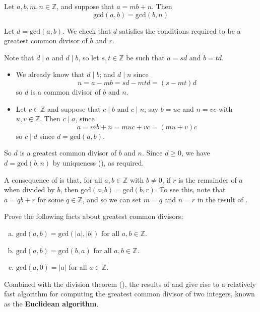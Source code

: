 \begin{theorem}
\label{thmGCDSubtractMultiple}
Let $a,b,m,n \in \mathbb{Z}$, and suppose that $a=mb+n$. Then
\[ \mathrm{gcd}(a,b) = \mathrm{gcd}(b,n) \]
\end{theorem}
\begin{cproof}
Let $d = \mathrm{gcd}(a,b)$. We check that $d$ satisfies the conditions required to be a greatest common divisor of $b$ and $r$.

Note that $d \mid a$ and $d \mid b$, so let $s,t \in \mathbb{Z}$ be such that $a=sd$ and $b=td$.
\begin{itemize}
\item We already know that $d \mid b$; and $d \mid n$ since
\[ n = a-mb = sd-mtd = (s-mt)d \]
so $d$ is a common divisor of $b$ and $n$.
\item Let $c \in \mathbb{Z}$ and suppose that $c \mid b$ and $c \mid n$; say $b = uc$ and $n=vc$ with $u,v \in \mathbb{Z}$. Then $c \mid a$, since
\[ a = mb+n = muc+vc = (mu+v)c \]
so $c \mid d$ since $d = \mathrm{gcd}(a,b)$.
\end{itemize}
So $d$ is a greatest common divisor of $b$ and $n$. Since $d \ge 0$, we have $d = \mathrm{gcd}(b,n)$ by uniqueness (), as required.
\end{cproof}

A consequence of  is that, for all $a,b \in \mathbb{Z}$ with $b \ne 0$, if $r$ is the remainder of $a$ when divided by $b$, then $\mathrm{gcd}(a,b) = \mathrm{gcd}(b,r)$. To see this, note that $a=qb+r$ for some $q \in \mathbb{Z}$, and so we can set $m=q$ and $n=r$ in the result of .

\begin{exercise}
\label{exFactsAboutGCDs}
Prove the following facts about greatest common divisors:
\begin{enumerate}[(a)]
\item\label{itmFactsAboutGCDsAbsoluteValue} $\mathrm{gcd}(a,b) = \mathrm{gcd}(|a|,|b|)$ for all $a,b \in \mathbb{Z}$.
\item\label{itmFactsAboutGCDsSwapOrder} $\mathrm{gcd}(a,b) = \mathrm{gcd}(b,a)$ for all $a,b \in \mathbb{Z}$.
\item\label{itmFactsAboutGCDsZero} $\mathrm{gcd}(a,0) = |a|$ for all $a \in \mathbb{Z}$.
\end{enumerate}
\vspace{-20pt}
\end{exercise}

Combined with the division theorem (), the results of  and  give rise to a relatively fast algorithm for computing the greatest common divisor of two integers, known as the \textbf{Euclidean algorithm}.

